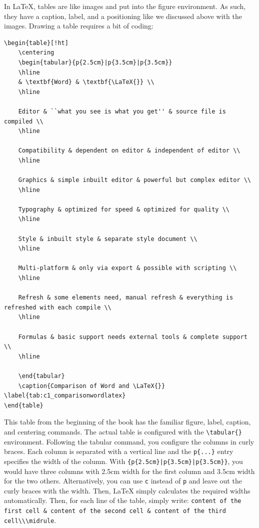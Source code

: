 In \LaTeX{}, tables are like images and put into the figure environment. As
such, they have a caption, label, and a positioning like we discussed above with
the images. Drawing a table requires a bit of coding:
\begin{lstlisting}[language=Tex]
\begin{table}[!ht]
    \centering
    \begin{tabular}{p{2.5cm}|p{3.5cm}|p{3.5cm}}
    \hline
    & \textbf{Word} & \textbf{\LaTeX{}} \\ 
    \hline
    
    Editor & ``what you see is what you get'' & source file is compiled \\
    \hline
    
    Compatibility & dependent on editor & independent of editor \\
    \hline
    
    Graphics & simple inbuilt editor & powerful but complex editor \\
    \hline
    
    Typography & optimized for speed & optimized for quality \\
    \hline
    
    Style & inbuilt style & separate style document \\
    \hline
    
    Multi-platform & only via export & possible with scripting \\
    \hline
    
    Refresh & some elements need, manual refresh & everything is refreshed with each compile \\
    \hline
    
    Formulas & basic support needs external tools & complete support \\
    \hline
    
    \end{tabular}
    \caption{Comparison of Word and \LaTeX{}} \label{tab:c1_comparisonwordlatex}
\end{table}
\end{lstlisting}

This table from the beginning of the book has the familiar figure, label,
caption, and centering commands. The actual table is configured with the
\lstinline[language=Tex]!\tabular{}! environment. Following the tabular command,
you configure the columns in curly braces. Each column is separated with a
vertical line and the \lstinline[language=Tex]!p{...}! %
entry specifies the width
of the column. With \lstinline[language=Tex]!{p{2.5cm}|p{3.5cm}|p{3.5cm}}!, you
would have three columns with 2.5cm width for the first column and 3.5cm width
for the two others. Alternatively, you can use \lstinline[language=Tex]!c!
instead of \lstinline[language=Tex]!p! and leave out the curly braces with the
width. Then, \LaTeX{} simply calculates the required widths automatically. Then,
for each line of the table, simply write: 
\lstinline[language=Tex]!content of the first cell & content of the second cell & content of the third cell\\\midrule!.

